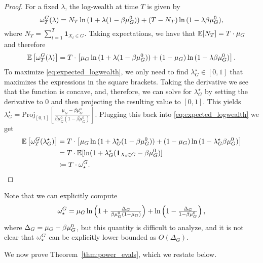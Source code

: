 \begin{proof}
For a fixed $\lambda$, the log-wealth at time $T$ is given by 
\begin{equation*}
\omega_T^G(\lambda) = N_T \ln{(1+\lambda(1-\beta\mu_G^0))} + (T-N_T) \ln{(1-\lambda\beta\mu_G^0)},
\end{equation*}
where $N_T = \sum_{t=1}^T \mathbf{1}_{X_t\in G}$. Taking expectations, we have that $\mathbb{E}[N_T] = T\cdot \mu_G$ and therefore 
\begin{equation}\label{eq:expected_logwealth}
\mathbb{E}\left[\omega_T^G(\lambda)\right] = T\cdot\left[\mu_G \ln{(1+\lambda(1-\beta\mu_G^0))} + (1-\mu_G) \ln{(1-\lambda\beta\mu_G^0)}\right]. 
\end{equation}
To maximize \eqref{eq:expected_logwealth}, we only need to find $\lambda_G^\star\in[0,1]$ that maximizes the expressions in the square brackets. Taking the derivative we see that the function is concave,
and, therefore, we can solve for $\lambda_G^\star$ by setting the derivative to $0$ and then projecting the resulting value to $[0,1]$. This yields
$\lambda^\star_G = \text{Proj}_{[0,1]}\left[\frac{\mu_G - \beta \mu_G^0}{\beta\mu_G^0(1-\beta\mu_G^0)}\right].$ Plugging this back into \eqref{eq:expected_logwealth} we get
\begin{align*}
\mathbb{E}\left[\omega_T^G(\lambda_G^\star)\right] &= T\cdot \left[\mu_G \ln{(1+\lambda_G^\star(1-\beta\mu_G^0))} + (1-\mu_G) \ln{(1-\lambda_G^\star\beta\mu_G^0)}\right] \\
&= T\cdot \mathbb{E}[\ln(1+\lambda_G^\star(\mathbf{1}_{X_t\in G} - \beta{\mu_G^0})] \\
&\coloneqq T\cdot \omega_\star^G.
\end{align*}
\end{proof}

\begin{remark}
    Note that we can explicitly compute 
\[\omega_\star^G = \mu_G \ln\left(    1 + \tfrac{\Delta_G}{\beta{\mu_G^0}(1 - \mu_G )}\right) + \ln\left(1 - \tfrac{\Delta_G}{1-\beta{\mu_G^0}}\right),\]
where $\Delta_G = \mu_G - \beta{\mu_G^0}$, but this quantity is difficult to analyze, and it is not clear that $\omega_\star^G$ can be explicitly lower bounded as $O(\Delta_G)$. 
\end{remark}

We now prove Theorem~\ref{thm:power_evals}, which we restate below.

\evalspower*

